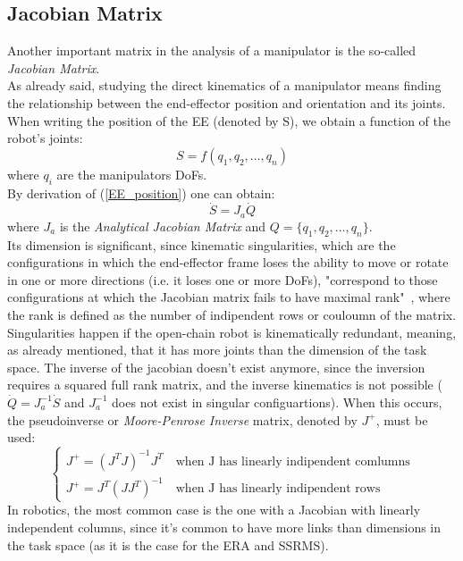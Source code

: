 \documentclass[a4paper,12pt,oneside]{report}
\begin{document}
\subsection{Jacobian Matrix}\label{jacobian_matrix}
Another important matrix in the analysis of a manipulator is the so-called \textit{Jacobian Matrix}.\\
As already said, studying the direct kinematics of a manipulator means finding the relationship between the end-effector position and orientation and its joints. When writing the position of the EE (denoted by S), we obtain a function of the robot's joints:
\begin{equation}
  S=f(q_1,q_2,\dots,q_n)
  \label{EE_position}
\end{equation}
where $q_i$ are the manipulators DoFs.\\
By derivation of (\ref{EE_position}) one can obtain:
\begin{equation}
  \dot{S}=J_a\dot{Q}
  \label{task_dimension}
\end{equation}
where $J_a$ is the \textit{Analytical Jacobian Matrix} and $Q=\{q_1,q_2,\dots,q_n\}$.\\
Its dimension is significant, since kinematic singularities, which are the configurations in which the end-eﬀector frame loses the ability to move or rotate in one or more directions (i.e. it loses one or more DoFs), "correspond to those configurations at which the Jacobian matrix fails to have maximal rank"~\cite{eleven}, where the rank is defined as the number of indipendent rows or couloumn of the matrix.\\
Singularities happen if the open-chain robot is kinematically redundant, meaning, as already mentioned, that it has more joints than the dimension of the task space. The inverse of the jacobian doesn't exist anymore, since the inversion requires a squared full rank matrix, and the inverse kinematics is not possible ($\dot{Q}=J_a^{-1}\dot{S} $ and $J_a^{-1}$ does not exist in singular configuartions). When this occurs, the pseudoinverse or \textit{Moore-Penrose Inverse} matrix, denoted by $J^+$, must be used:
\begin{equation}
  \begin{cases}
    J^+=(J^TJ)^{-1}J^T \quad \text{when J has linearly indipendent comlumns}\\
    J^+=J^T(JJ^T)^{-1} \quad \text{when J has linearly indipendent rows}
  \end{cases}
  \label{pseudoinverse}
\end{equation}
In robotics, the most common case is the one with a Jacobian with linearly independent columns, since it's common to have more links than dimensions in the task space (as it is the case for the ERA and SSRMS).
\newpage
\end{document}
